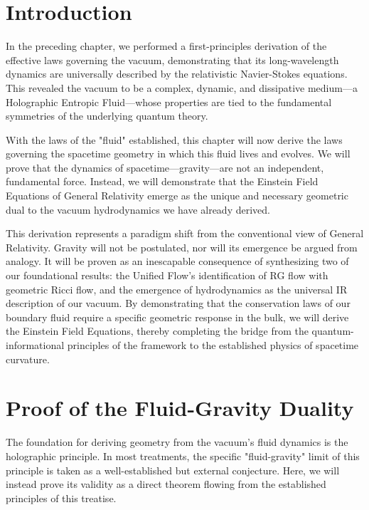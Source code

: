 \documentclass[11pt, letterpaper]{report}
\theoremstyle{plain} %
\theoremstyle{definition} %
\theoremstyle{remark} %
\begin{document}
\section{Introduction}
\label{sec:gravity_intro_revised}

In the preceding chapter, we performed a first-principles derivation of the effective laws governing the vacuum, demonstrating that its long-wavelength dynamics are universally described by the relativistic Navier-Stokes equations. This revealed the vacuum to be a complex, dynamic, and dissipative medium—a Holographic Entropic Fluid—whose properties are tied to the fundamental symmetries of the underlying quantum theory.

With the laws of the "fluid" established, this chapter will now derive the laws governing the spacetime geometry in which this fluid lives and evolves. We will prove that the dynamics of spacetime—gravity—are not an independent, fundamental force. Instead, we will demonstrate that the Einstein Field Equations of General Relativity emerge as the unique and necessary geometric dual to the vacuum hydrodynamics we have already derived.

This derivation represents a paradigm shift from the conventional view of General Relativity. Gravity will not be postulated, nor will its emergence be argued from analogy. It will be proven as an inescapable consequence of synthesizing two of our foundational results: the Unified Flow's identification of RG flow with geometric Ricci flow, and the emergence of hydrodynamics as the universal IR description of our vacuum. By demonstrating that the conservation laws of our boundary fluid require a specific geometric response in the bulk, we will derive the Einstein Field Equations, thereby completing the bridge from the quantum-informational principles of the framework to the established physics of spacetime curvature.

\section{Proof of the Fluid-Gravity Duality}
\label{sec:proof_fluid_gravity_duality}

The foundation for deriving geometry from the vacuum's fluid dynamics is the holographic principle. In most treatments, the specific "fluid-gravity" limit of this principle is taken as a well-established but external conjecture. Here, we will instead prove its validity as a direct theorem flowing from the established principles of this treatise.
\end{document}
